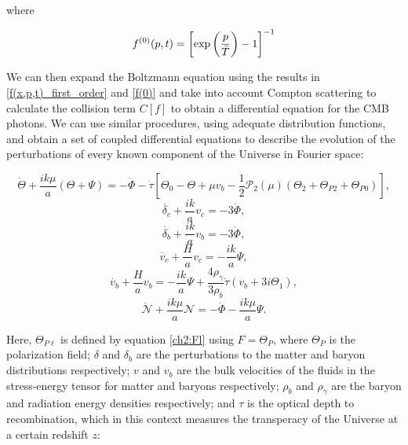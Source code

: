 \documentclass[openany,a4paper,12pt,oneside]{book}
\begin{document}
\begin{spacing}{1.5}
\noindent where

\begin{equation}\label{f(0)}
    f^{(0)}(p,t)=\left[\text{exp}\left(\frac{p}{\Bar{T}}\right)-1\right]^{-1}
\end{equation}

We can then expand the Boltzmann equation using the results in \eqref{f(x,p,t)_first_order} and \eqref{f(0)} and take into account Compton scattering to calculate the collision term $C[f]$ to obtain a differential equation for the CMB photons. We can use similar procedures, using adequate distribution functions, and obtain a set of coupled differential equations to describe the evolution of the perturbations of every known component of the Universe in Fourier space\cite{dodelson2020modern}:

\begin{equation}\label{diff_eq_radiation_perturbs}
    \dot{\Theta}+\frac{ik\mu}{a}(\Theta+\Psi)=-\dot{\Phi}-\dot{\tau}\left[\Theta_0-\Theta+\mu v_b-\frac{1}{2}\mathcal{P}_2(\mu)(\Theta_2+\Theta_{P2}+\Theta_{P0})\right],
\end{equation}
\begin{equation}
    \dot{\delta_c}+\frac{ik}{a}v_c=-3\dot{\Phi},
\end{equation}
\begin{equation}
    \dot{\delta_b}+\frac{ik}{a}v_b=-3\dot{\Phi},
\end{equation}
\begin{equation}
    \dot{v_c}+\frac{H}{a}v_c=-\frac{ik}{a}\Psi,
\end{equation}
\begin{equation}
    \dot{v_b}+\frac{H}{a}v_b=-\frac{ik}{a}\Psi+\frac{4\rho_\gamma}{3\rho_b}\dot{\tau}(v_b+3i\Theta_1),
\end{equation}
\begin{equation}\label{diff_eqs:neutrino_perturbations}
    \dot{\mathcal{N}}+\frac{ik\mu}{a}\mathcal{N}=-\dot{\Phi}-\frac{ik\mu}{a}\Psi.
\end{equation}

Here, $\Theta_{P\ell}$ is defined by equation \eqref{ch2:Fl} using $F=\Theta_P$, where $\Theta_P$ is the polarization field; $\delta$ and $\delta_b$ are the perturbations to the matter and baryon distributions respectively; $v$ and $v_b$ are the bulk velocities of the fluids in the stress-energy tensor for matter and baryons respectively; $\rho_b$ and $\rho_\gamma$ are the baryon and radiation energy densities respectively; and $\tau$ is the optical depth to recombination, which in this context measures the transperacy of the Universe at a certain redshift $z$:	


\end{spacing}
\end{document}
